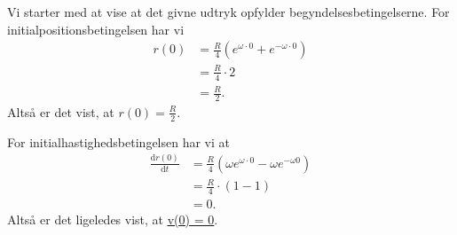 \documentclass[12pt]{article}
\theoremstyle{definition}
\begin{document}
Vi starter med at vise at det givne udtryk opfylder begyndelsesbetingelserne. For initialpositionsbetingelsen har vi
\begin{align*}
  r(0) &= \frac{R}{4}\left( e^{\omega \cdot 0} + e^{-\omega \cdot 0}\right) \\
  &= \frac{R}{4}\cdot 2 \\
  &= \frac{R}{2}
.\end{align*}
Altså er det vist, at \underline{\underline{$r(0) = \frac{R}{2}$}}.

For initialhastighedsbetingelsen har vi at
\begin{align*}
  \frac{\mathrm{d}r(0)}{\mathrm{d}t} &= \frac{R}{4} \left( \omega e^{\omega \cdot 0} - \omega e^{-\omega 0} \right) \\
  &= \frac{R}{4}\cdot (1-1) \\
  &= 0
.\end{align*}
Altså er det ligeledes vist, at \underline{\underline{v(0) = 0}}.
\end{document}
